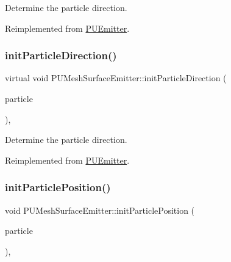 Determine the particle direction. 

Reimplemented from \hyperlink{classPUEmitter_a0dffa0a17008ddaaec73c6042ea1a019}{P\+U\+Emitter}.

\mbox{\label{classPUMeshSurfaceEmitter_a57b3e6788ced8af0dc152f0198fd7f97}} 
\subsubsection{\texorpdfstring{init\+Particle\+Direction()}{initParticleDirection()}\hspace{0.1cm}{\footnotesize\ttfamily [2/2]}}
{\footnotesize\ttfamily virtual void P\+U\+Mesh\+Surface\+Emitter\+::init\+Particle\+Direction (\begin{DoxyParamCaption}\item[{\hyperlink{structPUParticle3D}{P\+U\+Particle3D} $\ast$}]{particle }\end{DoxyParamCaption})\hspace{0.3cm}{\ttfamily [override]}, {\ttfamily [virtual]}}

Determine the particle direction. 

Reimplemented from \hyperlink{classPUEmitter_a0dffa0a17008ddaaec73c6042ea1a019}{P\+U\+Emitter}.

\mbox{\label{classPUMeshSurfaceEmitter_a9696ca685d847e4e3c4f403e66f95ecb}} 
\subsubsection{\texorpdfstring{init\+Particle\+Position()}{initParticlePosition()}\hspace{0.1cm}{\footnotesize\ttfamily [1/2]}}
{\footnotesize\ttfamily void P\+U\+Mesh\+Surface\+Emitter\+::init\+Particle\+Position (\begin{DoxyParamCaption}\item[{\hyperlink{structPUParticle3D}{P\+U\+Particle3D} $\ast$}]{particle }\end{DoxyParamCaption})\hspace{0.3cm}{\ttfamily [override]}, {\ttfamily [virtual]}}

